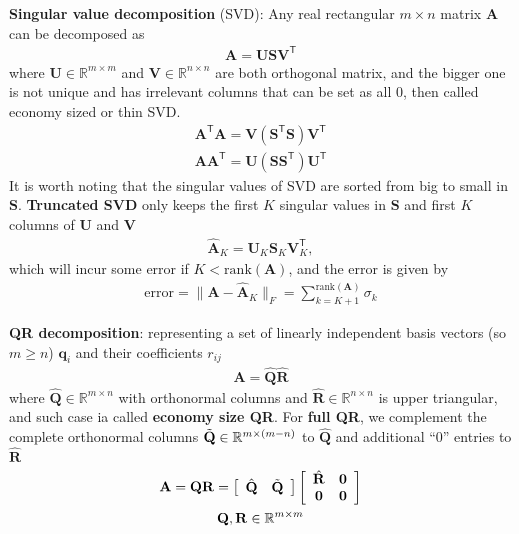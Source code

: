 \textbf{Singular value decomposition} (SVD):
Any real rectangular $m\times n$ matrix $\mathbf{A}$ can be decomposed as
\begin{gather}
    \mathbf{A}=\mathbf{USV}^\mathsf{T}
\end{gather}
where $\mathbf{U}\in\mathbb{R}^{m\times m}$ and $\mathbf{V}\in\mathbb{R}^{n\times n}$ are both orthogonal matrix,
and the bigger one is not unique and has irrelevant columns that can be set as all 0, then called economy sized or thin SVD.
\begin{gather}
    \mathbf{A}^\mathsf{T}\mathbf{A}=\mathbf{V}(\mathbf{S}^\mathsf{T}\mathbf{S})\mathbf{V}^\mathsf{T}\\
    \mathbf{AA}^\mathsf{T}=\mathbf{U}(\mathbf{SS}^\mathsf{T})\mathbf{U}^\mathsf{T}
\end{gather}
It is worth noting that the singular values of SVD are sorted from big to small in $\mathbf{S}$.
\textbf{Truncated SVD} only keeps the first $K$ singular values in $\mathbf{S}$ 
and first $K$ columns of $\mathbf{U}$ and $\mathbf{V}$
\begin{gather}
    \hat{\mathbf{A}}_K=\mathbf{U}_K\mathbf{S}_K\mathbf{V}_K^\mathsf{T},
\end{gather}
which will incur some error if $K<\mathrm{rank}(\mathbf{A})$, and the error is given by
\begin{gather}
    \text{error}=\|\mathbf{A}-\hat{\mathbf{A}}_K\|_F=\sum_{k=K+1}^{\mathrm{rank}(\mathbf{A})}\sigma_k
\end{gather}

\textbf{QR decomposition}: representing a set of linearly independent basis vectors (so $m \geq n$) $\bm{q}_i$ and their coefficients $r_{ij}$ 
\begin{gather}
    \mathbf{A}=\hat{\mathbf{Q}}\hat{\mathbf{R}}
\end{gather}
where $\hat{\mathbf{Q}}\in\mathbb{R}^{m\times n}$ with orthonormal columns and $\hat{\mathbf{R}}\in\mathbb{R}^{n\times n}$ is upper triangular,
and such case ia called \textbf{economy size QR}.
For \textbf{full QR}, we complement the complete orthonormal columns $\Tilde{\mathbf{Q}}\in\mathbb{R}^{m\times(m-n)}$ to $\hat{\mathbf{Q}}$ and additional ``0'' entries to $\hat{\mathbf{R}}$
\begin{gather}
    \mathbf{A}
    = \mathbf{QR}
    = \left[\begin{array}{cc}
        \hat{\mathbf{Q}} & \Tilde{\mathbf{Q}}
    \end{array}\right]
    \left[\begin{array}{cc}
        \hat{\mathbf{R}} & \mathbf{0} \\
        \mathbf{0} & \mathbf{0}
    \end{array}\right]\\
    \mathbf{Q},\mathbf{R}\in\mathbb{R}^{m\times m}
\end{gather}


